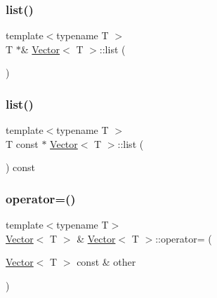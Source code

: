 \mbox{\label{classVector_aad3f85e26470d99139e3f96053bdacc4}} 
\subsubsection{\texorpdfstring{list()}{list()}\hspace{0.1cm}{\footnotesize\ttfamily [1/2]}}
{\footnotesize\ttfamily template$<$typename T $>$ \\
T $\ast$\& \hyperlink{classVector}{Vector}$<$ T $>$\+::list (\begin{DoxyParamCaption}{ }\end{DoxyParamCaption})\hspace{0.3cm}{\ttfamily [protected]}}

\mbox{\label{classVector_a2aaf129778179680e5932d96aa5471eb}} 
\subsubsection{\texorpdfstring{list()}{list()}\hspace{0.1cm}{\footnotesize\ttfamily [2/2]}}
{\footnotesize\ttfamily template$<$typename T $>$ \\
T const  $\ast$ \hyperlink{classVector}{Vector}$<$ T $>$\+::list (\begin{DoxyParamCaption}{ }\end{DoxyParamCaption}) const\hspace{0.3cm}{\ttfamily [protected]}}

\mbox{\label{classVector_a0feef299594680034402e23ff28b9f45}} 
\subsubsection{\texorpdfstring{operator=()}{operator=()}}
{\footnotesize\ttfamily template$<$typename T$>$ \\
\hyperlink{classVector}{Vector}$<$ T $>$ \& \hyperlink{classVector}{Vector}$<$ T $>$\+::operator= (\begin{DoxyParamCaption}\item[{\hyperlink{classVector}{Vector}$<$ T $>$ const \&}]{other }\end{DoxyParamCaption})}

